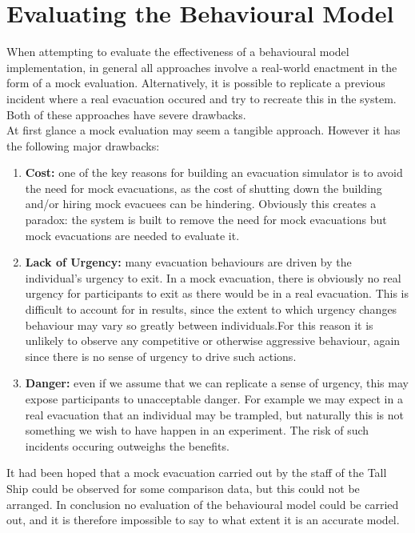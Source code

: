 \section{Evaluating the Behavioural Model}
When attempting to evaluate the effectiveness of a behavioural model implementation, in general all approaches involve a real-world enactment in the form of a mock evaluation. Alternatively, it is possible to replicate a previous incident where a real evacuation occured and try to recreate this in the system. Both of these approaches have severe drawbacks.\\

At first glance a mock evaluation may seem a tangible approach. However it has the following major drawbacks:
\begin{enumerate}
\item{\textbf{Cost:} one of the key reasons for building an evacuation simulator is to avoid the need for mock evacuations, as the cost of shutting down the building and/or hiring mock evacuees can be hindering. Obviously this creates a paradox: the system is built to remove the need for mock evacuations but mock evacuations are needed to evaluate it.}
\item{\textbf{Lack of Urgency:} many evacuation behaviours are driven by the individual's urgency to exit. In a mock evacuation, there is obviously no real urgency for participants to exit as there would be in a real evacuation. This is difficult to account for in results, since the extent to which urgency changes behaviour may vary so greatly between individuals.For this reason it is unlikely to observe any competitive or otherwise aggressive behaviour, again since there is no sense of urgency to drive such actions.}
\item{\textbf{Danger:} even if we assume that we can replicate a sense of urgency, this may expose participants to unacceptable danger. For example we may expect in a real evacuation that an individual may be trampled, but naturally this is not something we wish to have happen in an experiment. The risk of such incidents occuring outweighs the benefits.}
\end{enumerate}
It had been hoped that a mock evacuation carried out by the staff of the Tall Ship could be observed for some comparison data, but this could not be arranged. In conclusion no evaluation of the behavioural model could be carried out, and it is therefore impossible to say to what extent it is an accurate model.

